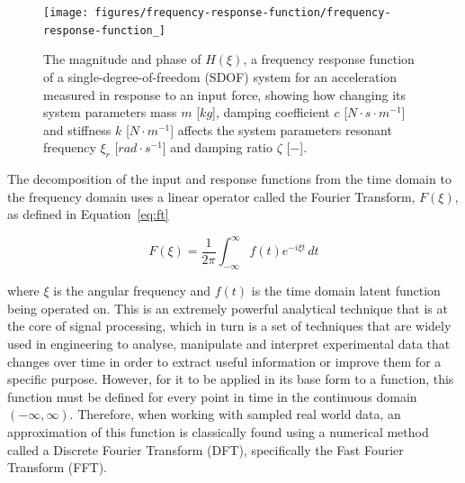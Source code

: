 \documentclass[12pt]{article}
\begin{document}
    \begin{figure}[ht]
        \centering
        \texttt{[image: figures/frequency-response-function/frequency-response-function\_]}
        \caption{The magnitude and phase of $H(\xi)$, a frequency response function of a single-degree-of-freedom (SDOF) system for an acceleration measured in response to an input force, showing how changing its system parameters mass $m$ [$kg$], damping coefficient $c$ [$N \cdot s \cdot m^{-1}$] and stiffness $k$ [$N \cdot m^{-1}$] affects the system parameters resonant frequency $\xi_r$ [$rad \cdot s^{-1}$] and damping ratio $\zeta$ [$-$].}
        \label{fig:frequency-response-function}
    \end{figure}

    The decomposition of the input and response functions from the time domain to the frequency domain uses a linear operator called the Fourier Transform, $F(\xi)$, as defined in Equation~\ref{eq:ft}

    \begin{equation}
        F(\xi) = \frac{1}{2 \pi} \int_{-\infty}^{\infty} f(t) e^{-i \xi t} \, dt\label{eq:ft}
    \end{equation}


    \noindent where $\xi$ is the angular frequency and $f(t)$ is the time domain latent function being operated on.
    This is an extremely powerful analytical technique that is at the core of signal processing, which in turn is a set of techniques that are widely used in engineering to analyse, manipulate and interpret experimental data that changes over time in order to extract useful information or improve them for a specific purpose.
    However, for it to be applied in its base form to a function, this function must be defined for every point in time in the continuous domain $(-\infty, \infty)$.
    Therefore, when working with sampled real world data, an approximation of this function is classically found using a numerical method called a Discrete Fourier Transform (DFT), specifically the Fast Fourier Transform (FFT).
\end{document}
